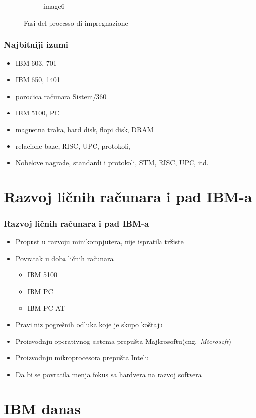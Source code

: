 \documentclass{beamer}
\begin{document}
\begin{frame}[fragile]
\begin{figure}[htb]
\begin{subfigure}{0.25\textwidth}
  \caption{image6}
  \label{fig:6}
\end{subfigure}
\caption{Fasi del processo di impregnazione}
\label{fig:images}
\end{figure}
\end{frame}

\begin{frame}[fragile]\frametitle{Najbitniji izumi}
	\begin{itemize}	
		\item IBM 603, 701
		\item IBM 650, 1401	
		\item porodica računara Sistem/360
		\item IBM 5100, PC
		\item magnetna traka, hard disk, flopi disk, DRAM
		\item relacione baze, RISC, UPC, protokoli,
		\item Nobelove nagrade, standardi i protokoli, STM, RISC, UPC, itd.
		\end{itemize}
\end{frame}

\section{Razvoj ličnih računara i pad IBM-a}
\begin{frame}[fragile]\frametitle{Razvoj ličnih računara i pad IBM-a}
	\begin{itemize}
	\item Propust u razvoju minikompjutera, nije ispratila tržiste
	\item Povratak u doba ličnih računara
	\begin{itemize}
	\item IBM 5100
	\item IBM PC
	\item IBM PC AT
	\end{itemize}
	\item Pravi niz pogrešnih odluka koje je skupo koštaju
	\item Proizvodnju operativnog sistema prepušta Majkrosoftu(eng.~{\em Microsoft})
	\item Proizvodnju mikroprocesora prepušta Intelu
	\item Da bi se povratila menja fokus sa hardvera na razvoj softvera
	\end{itemize}
\end{frame}



\section{IBM danas}
\end{document}
